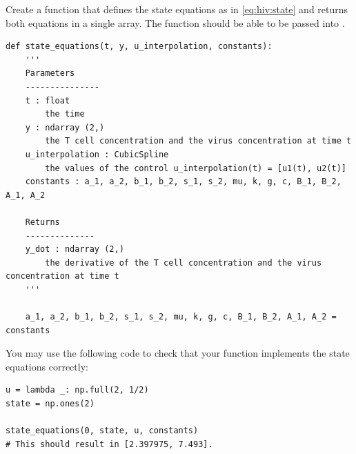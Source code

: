 \begin{problem}
Create a function that defines the state equations as in \eqref{eq:hiv:state} and returns both equations in a single array.
The function should be able to be passed into .

\begin{lstlisting}
def state_equations(t, y, u_interpolation, constants):
    '''
    Parameters
    ---------------
    t : float
        the time
    y : ndarray (2,)
        the T cell concentration and the virus concentration at time t
    u_interpolation : CubicSpline
        the values of the control u_interpolation(t) = [u1(t), u2(t)]
    constants : a_1, a_2, b_1, b_2, s_1, s_2, mu, k, g, c, B_1, B_2, A_1, A_2
    
    Returns
    --------------
    y_dot : ndarray (2,)
        the derivative of the T cell concentration and the virus concentration at time t
    '''

    a_1, a_2, b_1, b_2, s_1, s_2, mu, k, g, c, B_1, B_2, A_1, A_2 = constants
\end{lstlisting}

You may use the following code to check that your function implements the state equations correctly:

\begin{lstlisting}
u = lambda _: np.full(2, 1/2)
state = np.ones(2)

state_equations(0, state, u, constants)
# This should result in [2.397975, 7.493].
\end{lstlisting}

\label{problem:hiv:state}
\end{problem}

